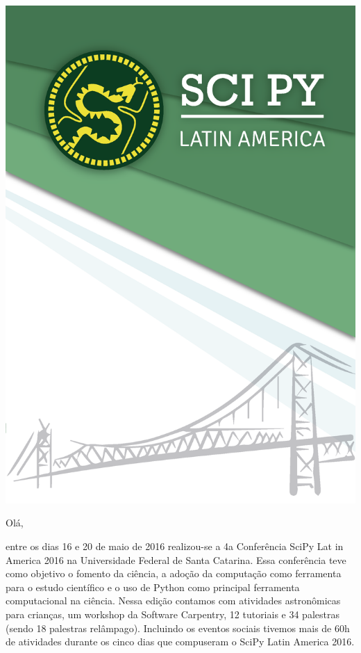 \documentclass[12pt]{article}
\begin{document}
\thispagestyle{empty}
\noindent  %
\includegraphics{../../assets/capa}
\NoBgThispage

\clearpage

\restoregeometry

\newpage

Olá,

entre os dias 16 e 20 de maio de 2016 realizou-se a 4a Conferência SciPy Lat    in America 2016 na Universidade Federal de Santa Catarina. Essa conferência     teve como objetivo o fomento da ciência, a adoção da computação como ferramenta para o estudo científico e o uso de Python como principal ferramenta computacional na ciência. Nessa edição contamos com atividades astronômicas para crianças,
um workshop da Software Carpentry,
12 tutoriais e 34 palestras (sendo 18 palestras relâmpago).
Incluindo os eventos sociais tivemos mais de 60h de atividades durante os cinco dias que compuseram o SciPy Latin America 2016.
\end{document}
